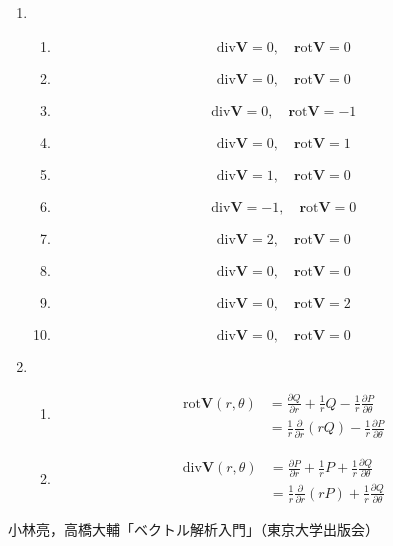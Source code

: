 \documentclass{jarticle}
\def\rot{\mathrm{\bm rot}}
\def\div{\mathrm{div}}
\begin{document}
\begin{enumerate}
    \item
      \begin{enumerate}
        \item 
          \[ \div \bm V = 0, \quad  \rot \bm V = 0 \]
        \item
          \[ \div \bm V = 0, \quad \rot \bm V = 0 \]
        
        \item
          \[ \div \bm V = 0, \quad \rot \bm V = -1 \]
        \item
          \[ \div \bm V = 0, \quad \rot \bm V = 1 \]
        \item 
          \[ \div \bm V = 1, \quad \rot \bm V = 0 \]
        \item
          \[ \div \bm V = -1, \quad \rot \bm V = 0 \]
        
        \item
          \[ \div \bm V = 2, \quad \rot \bm V = 0 \]
        \item
          \[ \div \bm V = 0, \quad \rot \bm V = 0 \]
      
        \item
          \[ \div \bm V = 0, \quad \rot \bm V = 2 \]
        \item
          \[ \div \bm V = 0, \quad \rot \bm V = 0 \]
      \end{enumerate}
    \item
      \begin{enumerate}
   \item \begin{align*}
   \mathrm {rot} \bm V (r,\theta)&= \frac{\partial Q}{\partial r} +\frac{1}{r}Q-\frac{1}{r} \frac{\partial P}{\partial \theta}
   \\
   &= \frac{1}{r} \frac{\partial }{\partial r}(rQ)-\frac{1}{r} \frac{\partial P}{\partial \theta}
   \end{align*}
\item 
\begin{align*} 
  \mathrm {div} \bm V (r,\theta)&= \frac{\partial P}{\partial r} +\frac{1}{r}P+\frac{1}{r} \frac{\partial Q}{\partial \theta}
   \\
   &= \frac{1}{r} \frac{\partial }{\partial r}(rP)+\frac{1}{r} \frac{\partial Q}{\partial \theta}
   \end{align*}
          
      \end{enumerate}
  \end{enumerate}
  

\newpage

\begin{thebibliography}{99}
 小林亮，高橋大輔「ベクトル解析入門」（東京大学出版会）
\end{thebibliography}
\end{document}
